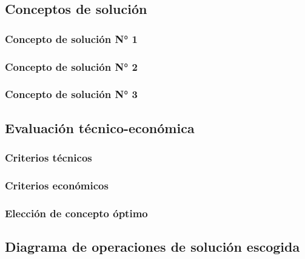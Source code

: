 \subsection{Conceptos de solución}

\subsubsection{Concepto de solución N° 1}

\subsubsection{Concepto de solución N° 2}

\subsubsection{Concepto de solución N° 3}

\subsection{Evaluación técnico-económica}

\subsubsection{Criterios técnicos}

\subsubsection{Criterios económicos}

\subsubsection{Elección de concepto óptimo}

\subsection{Diagrama de operaciones de solución escogida}




